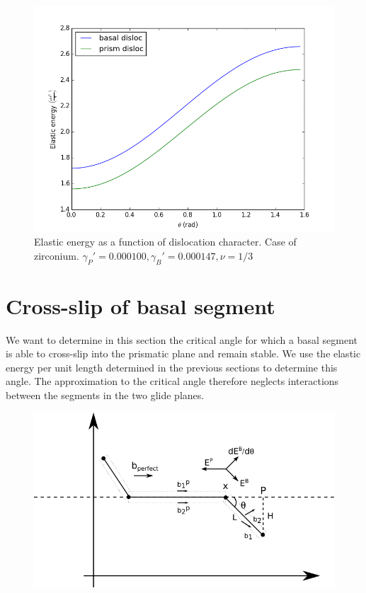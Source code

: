 \documentclass[10pt,a4paper,final]{article}
\begin{document}
\begin{figure}[htbp]
\centering
\includegraphics[scale=0.7]{png/zr_basal_prism}
\caption{Elastic energy as a function of dislocation character. Case of zirconium. $\gamma_P' = 0.000100, \gamma_B' = 0.000147, \nu=1/3$}
\label{fig:zr}
\end{figure}
\pagebreak
\section{Cross-slip of basal segment}
We want to determine in this section the critical angle for which a basal segment is able to cross-slip into the prismatic plane and remain stable. We use the elastic energy per unit length determined in the previous sections to determine this angle. The approximation to the critical angle therefore neglects interactions between the segments in the two glide planes.\\

\begin{figure}[hbp]
\centering
\includegraphics[scale=1]{png/node_schema.png}
\label{fig:crossslip}
\end{figure}
\end{document}
